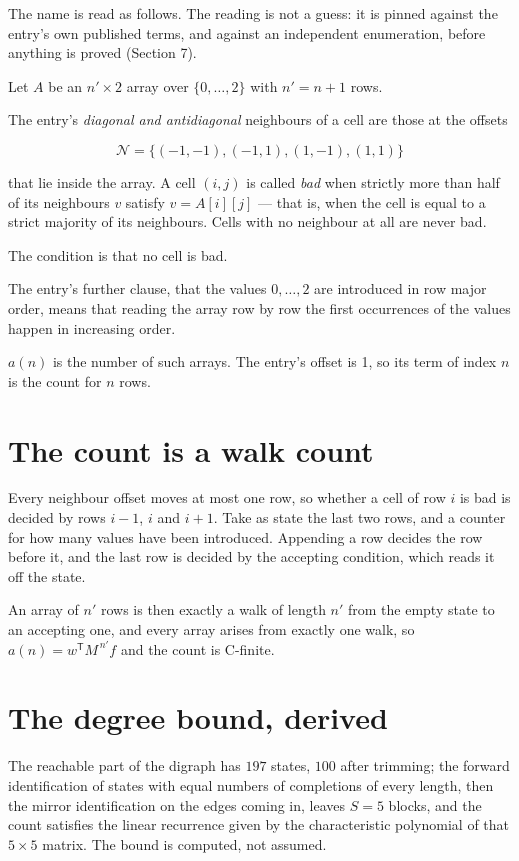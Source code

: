 \documentclass[11pt]{article}
\theoremstyle{definition}
\begin{document}
The name is read as follows. The reading is not a guess: it is pinned against the entry's own published terms, and against an independent enumeration, before anything is proved (Section 7).

Let $A$ be an $n' \times 2$ array over $\{0,\dots,2\}$ with $n' = n + 1$ rows.

The entry's {\itshape diagonal and antidiagonal} neighbours of a cell are those at the offsets

\[\mathcal{N} = \{(-1,-1), (-1,1), (1,-1), (1,1)\}\]

that lie inside the array. A cell $(i,j)$ is called {\itshape bad} when strictly more than half of its neighbours $v$ satisfy $v = A[i][j]$ --- that is, when the cell is equal to a strict majority of its neighbours. Cells with no neighbour at all are never bad.

The condition is that no cell is bad.

The entry's further clause, that the values $0,\dots,2$ are introduced in row major order, means that reading the array row by row the first occurrences of the values happen in increasing order.

$a(n)$ is the number of such arrays. The entry's offset is 1, so its term of index $n$ is the count for $n$ rows.

\section{The count is a walk count}

Every neighbour offset moves at most one row, so whether a cell of row $i$ is bad is decided by rows $i-1$, $i$ and $i+1$. Take as state the last two rows, and a counter for how many values have been introduced. Appending a row decides the row before it, and the last row is decided by the accepting condition, which reads it off the state.

An array of $n'$ rows is then exactly a walk of length $n'$ from the empty state to an accepting one, and every array arises from exactly one walk, so $a(n) = w^{\mathsf T}M^{\,n'}f$ and the count is C-finite.

\section{The degree bound, derived}

The reachable part of the digraph has $197$ states, $100$ after trimming; the forward identification of states with equal numbers of completions of every length, then the mirror identification on the edges coming in, leaves $S = 5$ blocks, and the count satisfies the linear recurrence given by the characteristic polynomial of that $5\times5$ matrix. The bound is computed, not assumed.
\end{document}
